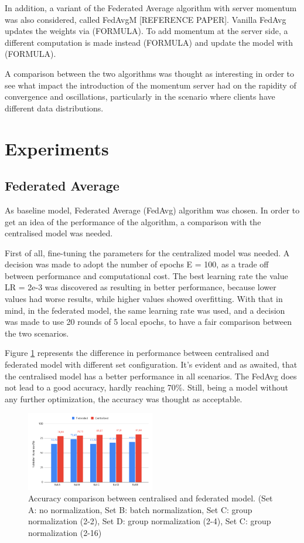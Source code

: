 \documentclass[twocolumn]{article}
\begin{document}
In addition, a variant of the Federated Average algorithm with server momentum was also considered, called FedAvgM [REFERENCE PAPER]. Vanilla FedAvg updates the weights via (FORMULA). To add momentum at the server side, a different computation is made instead (FORMULA) and update the model with (FORMULA). 

A comparison between the two algorithms was thought as interesting in order to see what impact the introduction of the momentum server had on the rapidity of convergence and oscillations, particularly in the scenario where clients have different data distributions.


\section{Experiments} %
\subsection{Federated Average}
As baseline model, Federated Average (FedAvg) algorithm was chosen. In order to get an idea of the performance of the algorithm, a comparison with the centralised model was needed. 

First of all, fine-tuning the parameters for the centralized model was needed. A decision was made to adopt the number of epochs E = 100, as a trade off between performance and computational cost. The best learning rate the value LR = 2e-3 was discovered as resulting in better performance, because lower values had worse results, while higher values showed overfitting. With that in mind, in the federated model, the same learning rate was used, and a decision was made to use 20 rounds of 5 local epochs, to have a fair comparison between the two scenarios.

Figure \ref{AccCompFedCent} represents the difference in performance between centralised and federated model with different set configuration. It's evident and as awaited, that the centralised model has a better performance in all scenarios. The FedAvg does not lead to a good accuracy, hardly reaching 70\%. Still, being a model without any further optimization, the accuracy was thought as acceptable.


\begin{figure}
    \centering
    \includegraphics[width=0.5\textwidth,height=.3\textheight]{FedAccuracyComp.png}
    \caption{Accuracy comparison between centralised and federated model. (Set A: no normalization, Set B: batch normalization, Set C: group normalization (2-2), Set D: group normalization (2-4), Set C: group normalization (2-16)}
     \label{AccCompFedCent} 
\end{figure}
\end{document}

